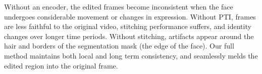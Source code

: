 Without an encoder, the edited frames become inconsistent when the face undergoes considerable movement or changes in expression. Without PTI, frames are less faithful to the original video, stitching performance suffers, and identity changes over longer time periods.
Without stitching, artifacts appear around the hair and borders of the segmentation mask (\ie the edge of the face). Our full method maintains both local and long term consistency, and seamlessly melds the edited region into the original frame.

